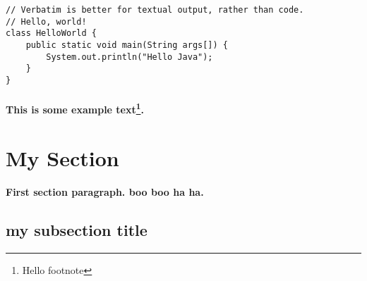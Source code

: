 \begin{verbatim}
// Verbatim is better for textual output, rather than code.
// Hello, world!
class HelloWorld {
    public static void main(String args[]) {
        System.out.println("Hello Java");  
    }
}
\end{verbatim}

%
%
%
%
%

\hrulefill %


\paragraph*{
    This is some example text\footnote{\label{myfootnote}Hello footnote}.
}


\pagebreak[4]
\section*{My Section}

\paragraph*{
    First section paragraph. boo boo ha ha.
}

\subsection{
    my subsection title
}
